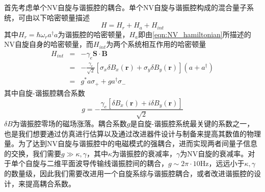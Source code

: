             首先考虑单个NV自旋与谐振腔的耦合。单个NV自旋与谐振腔构成的混合量子系统，可由以下哈密顿量描述
            \begin{equation}
            \label{eqn:Hamiltonian_resonator_NV}
                H = H_r + H_a + H_{int}
            \end{equation}
            其中$H_r = \hbar \omega_r a^\dagger a $为谐振腔的哈密顿量，$H_a$即由\ref{eqn:NV_hamiltonian}所描述的NV自旋自身的哈密顿量，而$H_{int}$为两个系统相互作用的哈密顿量\cite{grezes2016towards}
            \begin{eqnarray}
                H_{int} &=& - \gamma_e \bm S \cdot \bm B\\
                        &=& - \frac{\gamma_e}{\sqrt 2} [ \sigma_x \delta B_x (\bm r) + \sigma_y \delta B_y (\bm r) ](a + a^\dagger) \\
                        &=& g^* a \sigma_+ + g a^\dagger \sigma_-
            \end{eqnarray}
            其中自旋-谐振腔耦合系数
            \begin{equation}
            \label{eqn:coupling_coeff}
                g = - \frac{\gamma_e [ \delta B_x(\bm r) + i \delta B_y(\bm r) ] }{\sqrt 2}
            \end{equation}
            $\delta B $为谐振腔零场的磁场涨落。耦合系数$g$是自旋-谐振腔系统最关键的系数之一，也是我们想要通过仿真进行估算以及通过改进器件设计与制备来提高其数值的物理量。为了达到NV自旋与谐振腔中的电磁模式的强耦合，进而实现两者间量子信息的交换，我们需要$ g\gg \kappa, \gamma $，其中$ \kappa $为谐振腔的衰减率，$\gamma $为NV自旋的衰减率。对于单个自旋与二维平面波导传输线谐振腔间的耦合，$g\sim 2\pi\cdot 10 $Hz\cite{grezes2016towards}，远远小于$\kappa, \gamma $的数量级，因此我们需要改进用一个自旋系综与谐振腔耦合，或者改进谐振腔的设计，来提高耦合系数。


